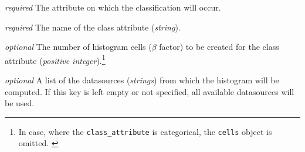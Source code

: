 \begin{description}[labelwidth=5em, leftmargin=\dimexpr\labelwidth+\labelsep\relax]
\begin{description}[labelwidth=9em, leftmargin=\dimexpr\labelwidth+\labelsep\relax]
    \item[\texttt{class\_attribute}:] {\color{red}\textit{required}} The attribute on which the classification will occur.
    \begin{description}[labelwidth=3em, leftmargin=\dimexpr\labelwidth+\labelsep\relax]
        \item[\texttt{name}:] {\color{red}\textit{required}} The name of the class attribute (\textit{string}).

        \item[\texttt{cells}:] {\color{blue}\textit{optional}} The number of histogram cells ($\beta$ factor) to be created for the class attribute (\textit{positive integer}).\footnote{In case, where the \texttt{class\_attribute} is categorical, the \texttt{cells} object is omitted. \label{refnote2}}
    \end{description}

    \item[\texttt{datasources}:] {\color{blue}\textit{optional}} A list of the datasources (\textit{strings}) from which the histogram will be computed.
    If this key is left empty or not specified, all available datasources will be used.

\end{description}


\end{description}
